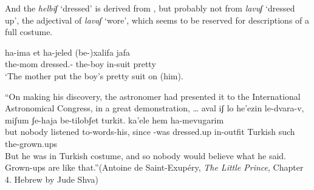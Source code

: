 \begin{exe}
\begin{xlist}
\begin{xlist}
\begin{exe}
\begin{exe}
\begin{xlist}
\begin{exe}
\begin{xlist}
\begin{exe}
\begin{xlist}
\begin{xlist}
\begin{exe}
\begin{xlist}
\begin{exe}
\begin{xlist}
\begin{exe}
\begin{exe}
\begin{exe}
\begin{xlist}
\begin{exe}
\begin{exe}
\begin{xlist}
\begin{xlist}
\begin{exe}
\begin{xlist}
\begin{exe}
\begin{exe}
\begin{exe}
\begin{xlist}
\begin{exe}
\begin{exe}
\begin{xlist}
\begin{exe}
\begin{xlist}
\begin{exe}
\begin{xlist}
\begin{exe}
\begin{xlist}
\begin{exe}
\begin{exe}
\begin{xlist}
\begin{exe}
\begin{exe}
\begin{xlist}
\begin{xlist}
\begin{exe}
\begin{xlist}
\begin{xlist}
\begin{exe}
\begin{xlist}
\begin{exe}
\begin{xlist}
\begin{exe}
\begin{xlist}
\begin{exe}
\begin{xlist}
\begin{exe}
\begin{exe}
\begin{exe}
\begin{exe}
\begin{xlist}
\begin{exe}
\begin{exe}
\begin{xlist}
\begin{xlist}
\begin{exe}
\begin{exe}
\begin{xlist}
\begin{exe}
\begin{xlist}
\begin{exe}
\begin{xlist}
\begin{exe}
\begin{xlist}
\begin{exe}
\begin{xlist}
\begin{exe}
\begin{exe}
\begin{exe}
\begin{exe}
\begin{xlist}
And the  \emph{helbiʃ} `dressed' is derived from , but probably not from \emph{lavuʃ} `dressed up', the adjectival  of \emph{lavaʃ} `wore', which seems to be reserved for descriptions of a full costume.
 \begin{exe}
 \ex  
 \begin{xlist} 
 	\ex   
 		{ \gll ha-ima  et ha-jeled (be-)xalifa jafa\\
 		  the-mom dressed.-  the-boy in-suit pretty\\
 		\glt `The mother put the boy's pretty suit on (him). } 
		
	
 	\ex  ``On making his discovery, the astronomer had presented it to the International Astronomical Congress, in a great demonstration, \dots 	
 		{ \gll aval iʃ lo he'ezin le-dvara-v, miʃum ʃe-haja  be-tilobʃet turkit. ka'ele hem ha-mevugarim\\
 		  but nobody  listened to-words-his, since -was dressed.up in-outfit Turkish such  the-grown.ups\\
 		\glt But he was in Turkish costume, and so nobody would believe what he said. Grown-ups are like that.''\hfill {(Antoine de Saint-Exup\'ery, \emph{The Little Prince}, Chapter 4. Hebrew by Jude Shva\footnotemark)} } 
	

\end{xlist}
\end{exe}
\end{xlist}
\end{exe}
\end{exe}
\end{exe}
\end{exe}
\end{xlist}
\end{exe}
\end{xlist}
\end{exe}
\end{xlist}
\end{exe}
\end{xlist}
\end{exe}
\end{xlist}
\end{exe}
\end{exe}
\end{xlist}
\end{xlist}
\end{exe}
\end{exe}
\end{xlist}
\end{exe}
\end{exe}
\end{exe}
\end{exe}
\end{xlist}
\end{exe}
\end{xlist}
\end{exe}
\end{xlist}
\end{exe}
\end{xlist}
\end{exe}
\end{xlist}
\end{xlist}
\end{exe}
\end{xlist}
\end{xlist}
\end{exe}
\end{exe}
\end{xlist}
\end{exe}
\end{exe}
\end{xlist}
\end{exe}
\end{xlist}
\end{exe}
\end{xlist}
\end{exe}
\end{xlist}
\end{exe}
\end{exe}
\end{xlist}
\end{exe}
\end{exe}
\end{exe}
\end{xlist}
\end{exe}
\end{xlist}
\end{xlist}
\end{exe}
\end{exe}
\end{xlist}
\end{exe}
\end{exe}
\end{exe}
\end{xlist}
\end{exe}
\end{xlist}
\end{exe}
\end{xlist}
\end{xlist}
\end{exe}
\end{xlist}
\end{exe}
\end{xlist}
\end{exe}
\end{exe}
\end{xlist}
\end{xlist}
\end{exe}
